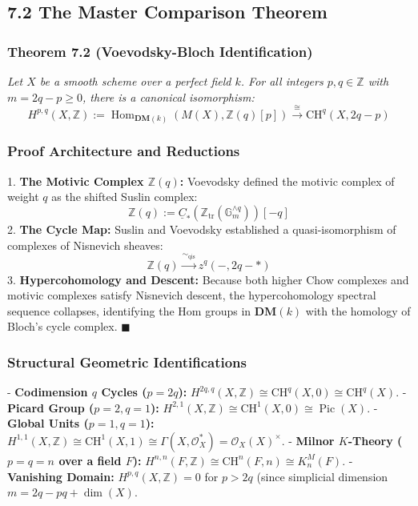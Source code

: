 \documentclass[11pt,twoside,openright]{amsbook}
\begin{document}
{\subsection{7.2 The Master Comparison Theorem}
\subsubsection{Theorem 7.2 (Voevodsky-Bloch Identification)}
\textit{Let $X$ be a smooth scheme over a perfect field $k$. For all integers $p, q \in \mathbb{Z}$ with $m = 2q - p \ge 0$, there is a canonical isomorphism:}
$$H^{p, q}(X, \mathbb{Z}) := \operatorname{Hom}_{\mathbf{DM}(k)}(M(X), \mathbb{Z}(q)[p]) \overset{\cong}{\longrightarrow} \mathrm{CH}^q(X, 2q - p)$$

\subsubsection{Proof Architecture and Reductions}
1. \textbf{The Motivic Complex $\mathbb{Z}(q)$:} Voevodsky defined the motivic complex of weight $q$ as the shifted Suslin complex:
$$\mathbb{Z}(q) := \underline{C}_*(\mathbb{Z}_{\mathrm{tr}}(\mathbb{G}_m^{\wedge q}))[-q]$$
2. \textbf{The Cycle Map:} Suslin and Voevodsky established a quasi-isomorphism of complexes of Nisnevich sheaves:
$$\mathbb{Z}(q) \overset{\sim_{\mathrm{qis}}}{\longrightarrow} z^q(-, 2q - *)$$
3. \textbf{Hypercohomology and Descent:} Because both higher Chow complexes and motivic complexes satisfy Nisnevich descent, the hypercohomology spectral sequence collapses, identifying the Hom groups in $\mathbf{DM}(k)$ with the homology of Bloch's cycle complex. $\blacksquare$

\subsubsection{Structural Geometric Identifications}
- \textbf{Codimension $q$ Cycles ($p = 2q$):} $H^{2q, q}(X, \mathbb{Z}) \cong \mathrm{CH}^q(X, 0) \cong \mathrm{CH}^q(X)$.
- \textbf{Picard Group ($p = 2, q = 1$):} $H^{2, 1}(X, \mathbb{Z}) \cong \mathrm{CH}^1(X, 0) \cong \operatorname{Pic}(X)$.
- \textbf{Global Units ($p = 1, q = 1$):} $H^{1, 1}(X, \mathbb{Z}) \cong \mathrm{CH}^1(X, 1) \cong \Gamma(X, \mathcal{O}_X^*) = \mathcal{O}_X(X)^\times$.
- \textbf{Milnor $K$-Theory ($p = q = n$ over a field $F$):} $H^{n, n}(F, \mathbb{Z}) \cong \mathrm{CH}^n(F, n) \cong K_n^M(F)$.
- \textbf{Vanishing Domain:} $H^{p, q}(X, \mathbb{Z}) = 0$ for $p > 2q$ (since simplicial dimension $m = 2q - p  q + \dim(X)$.

}
\end{document}
